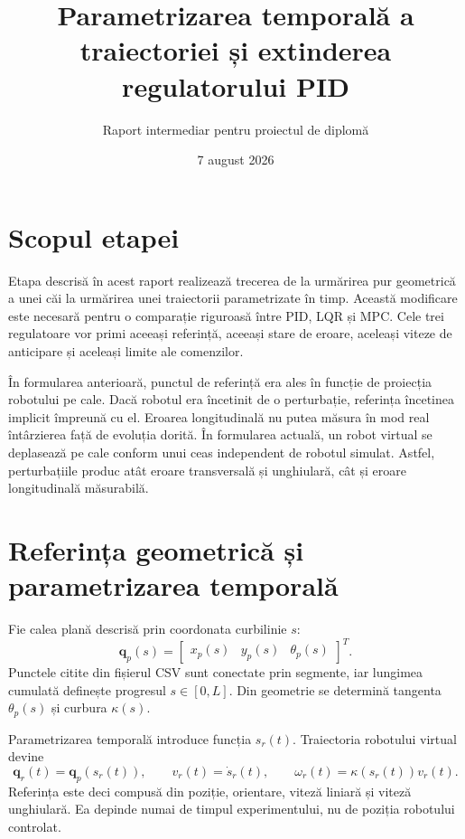 \documentclass[12pt,a4paper]{article}
\title{Parametrizarea temporală a traiectoriei și extinderea regulatorului PID}
\author{Raport intermediar pentru proiectul de diplomă}
\date{7 august 2026}
\begin{document}
\maketitle

\section{Scopul etapei}

Etapa descrisă în acest raport realizează trecerea de la urmărirea pur
geometrică a unei căi la urmărirea unei traiectorii parametrizate în timp.
Această modificare este necesară pentru o comparație riguroasă între PID, LQR
și MPC. Cele trei regulatoare vor primi aceeași referință, aceeași stare de
eroare, aceleași viteze de anticipare și aceleași limite ale comenzilor.

În formularea anterioară, punctul de referință era ales în funcție de proiecția
robotului pe cale. Dacă robotul era încetinit de o perturbație, referința
încetinea implicit împreună cu el. Eroarea longitudinală nu putea măsura în mod
real întârzierea față de evoluția dorită. În formularea actuală, un robot
virtual se deplasează pe cale conform unui ceas independent de robotul simulat.
Astfel, perturbațiile produc atât eroare transversală și unghiulară, cât și
eroare longitudinală măsurabilă.

\section{Referința geometrică și parametrizarea temporală}

Fie calea plană descrisă prin coordonata curbilinie $s$:
\begin{equation}
  \mathbf{q}_p(s) =
  \begin{bmatrix}x_p(s) & y_p(s) & \theta_p(s)\end{bmatrix}^{T}.
\end{equation}
Punctele citite din fișierul CSV sunt conectate prin segmente, iar lungimea
cumulată definește progresul $s\in[0,L]$. Din geometrie se determină tangenta
$\theta_p(s)$ și curbura $\kappa(s)$.

Parametrizarea temporală introduce funcția $s_r(t)$. Traiectoria robotului
virtual devine
\begin{equation}
  \mathbf{q}_r(t)=\mathbf{q}_p(s_r(t)), \qquad
  v_r(t)=\dot{s}_r(t), \qquad
  \omega_r(t)=\kappa(s_r(t))v_r(t).
\end{equation}
Referința este deci compusă din poziție, orientare, viteză liniară și viteză
unghiulară. Ea depinde numai de timpul experimentului, nu de poziția robotului
controlat.
\end{document}
